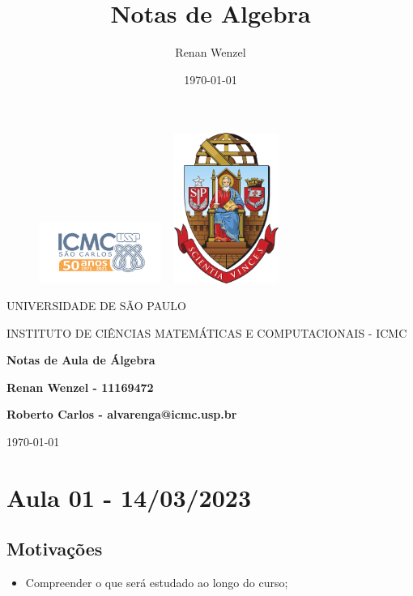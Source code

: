 \documentclass{article}
\title{Notas de Algebra}
\author{Renan Wenzel}
\date{\today}
\begin{document}
 \begin{figure}[ht]
		\includegraphics[width=4cm]{../icmc.png}
		\hspace{7cm}
		\includegraphics[height=4.9cm,width=4cm]{../brasao_usp_cor.jpg}
	\endminipage	
\end{figure}

\begin{center}
	\vspace{1cm}
	\LARGE
	UNIVERSIDADE DE S\~AO PAULO

	\vspace{1.3cm}
	\LARGE
	INSTITUTO DE CI\^ENCIAS MATEM\'ATICAS E COMPUTACIONAIS - ICMC

	\vspace{1.7cm}
	\Large
	\textbf{Notas de Aula de \'Algebra}

	\vspace{1.3cm}
	\large
	\textbf{Renan Wenzel - 11169472}

	\vspace{1.3cm}
	\large
	\textbf{Roberto Carlos - alvarenga@icmc.usp.br}

	\vspace{1.3cm}
	\today
\end{center}

 \newpage

 \tableofcontents

 \newpage

\section{Aula 01 - 14/03/2023}
\subsection{Motiva\c c\~oes}
\begin{itemize}
  \item Compreender o que ser\'a estudado ao longo do curso;
\end{itemize}
\end{document}
